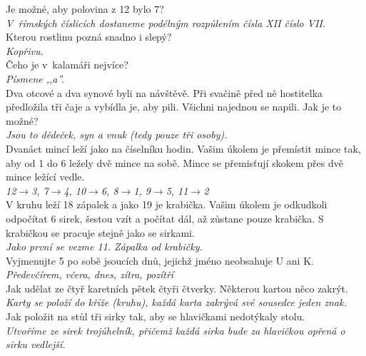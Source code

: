 \begin{multicols}{2}
\noindent
Je možné, aby polovina z 12 bylo 7?\\[1 mm]
{\sl V~římských číslicích dostaneme podélným rozpůlením 
čísla XII číslo VII.}\\

\noindent
Kterou rostlinu pozná snadno i slepý?\\[1 mm]
{\sl Kopřivu.}\\

\noindent
Čeho je v~kalamáři nejvíce?\\[1 mm]
{\sl Písmene ,,a''.}\\

\noindent
Dva otcové a dva synové byli na návštěvě. Při svačině 
před ně hostitelka předložila tři čaje a vybídla je, aby pili. 
Všichni najednou se napili. Jak je to možné?\\[1 mm]
{\sl Jsou to dědeček, syn a vnuk (tedy pouze tři osoby).}\\

\noindent
Dvanáct mincí leží jako na číselníku hodin. Vašim úkolem je 
přemístit mince tak, aby od 1 do 6 ležely dvě mince na sobě. 
Mince se přemisťují skokem přes dvě mince ležící vedle.\\[1 mm]
{\sl 12$\rightarrow$3, 7$\rightarrow$4, 10$\rightarrow$6, 8$\rightarrow$1, 
9$\rightarrow$5, 11$\rightarrow$2}\\

\noindent
V kruhu leží 18 zápalek a jako 19 je krabička. Vašim úkolem 
je odkudkoli odpočítat 6 sirek, šestou vzít a počítat dál, až 
zůstane pouze krabička. S krabičkou se pracuje stejně jako se 
sirkami.\\[1 mm]
{\sl Jako první se vezme 11. Zápalka od krabičky.}\\

\noindent
Vyjmenujte 5 po sobě jsoucích dnů, jejichž jméno neobsahuje 
U ani K.\\[1 mm]
{\sl Předevčírem, včera, dnes, zítra, pozítří}\\

\noindent
Jak udělat ze čtyř karetních pětek čtyři čtverky. Některou 
kartou něco zakrýt.\\[1 mm]
{\sl Karty se položí do kříže (kruhu), každá karta zakrývá své 
sousedce jeden znak.}\\

\noindent
Jak položit na stůl tři sirky tak, aby se hlavičkami 
nedotýkaly stolu.\\[1 mm]
{\sl Utvoříme ze sirek trojúhelník, přičemž každá sirka bude za 
hlavičkou opřená o sirku vedlejší.}\\


\end{multicols}
